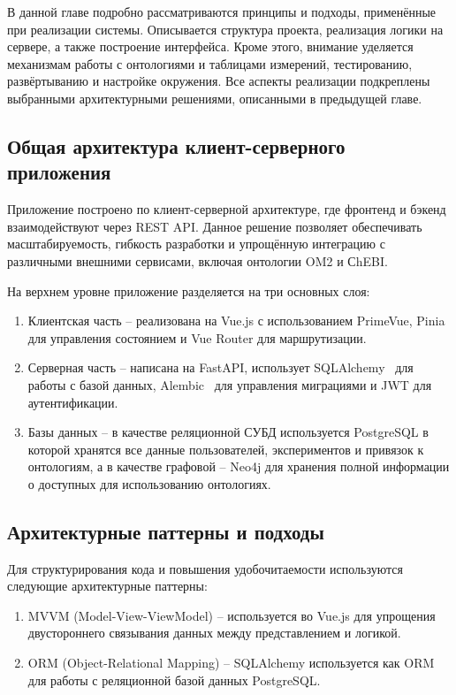 \setcounter{section}{3}
\setcounter{subsection}{0}
 \label{sec: 3}

В данной главе подробно рассматриваются принципы и подходы, применённые при реализации системы.
Описывается структура проекта, реализация логики на сервере, а также построение интерфейса.
Кроме этого, внимание уделяется механизмам работы с онтологиями и таблицами измерений, тестированию, развёртыванию и настройке окружения.
Все аспекты реализации подкреплены выбранными архитектурными решениями, описанными в предыдущей главе.

\subsection{Общая архитектура клиент-серверного приложения}

Приложение построено по клиент-серверной архитектуре, где фронтенд и бэкенд взаимодействуют через REST API. Данное решение позволяет обеспечивать масштабируемость, гибкость разработки и упрощённую интеграцию с различными внешними сервисами, включая онтологии OM2 и СhEBI.

На верхнем уровне приложение разделяется на три основных слоя:
\begin{enumerate}
    \item Клиентская часть -- реализована на Vue.js с использованием PrimeVue, Pinia для управления состоянием и Vue Router для маршрутизации.
    \item Серверная часть -- написана на FastAPI, использует SQLAlchemy~\cite{Library:SQLAlchemy} для работы с базой данных, Alembic~\cite{Library:Alembic} для управления миграциями и JWT для аутентификации.
    \item Базы данных -- в качестве реляционной СУБД используется PostgreSQL в которой хранятся все данные пользователей, экспериментов и привязок к онтологиям, а в качестве графовой -- Neo4j для хранения полной информации о доступных для использованию онтологиях.
\end{enumerate}

\subsection{Архитектурные паттерны и подходы}

Для структурирования кода и повышения удобочитаемости используются следующие архитектурные паттерны:

\begin{enumerate}
    \item MVVM (Model-View-ViewModel) -- используется во Vue.js для упрощения двустороннего связывания данных между представлением и логикой.
    \item ORM (Object-Relational Mapping) -- SQLAlchemy используется как ORM для работы с реляционной базой данных PostgreSQL.
\end{enumerate}

